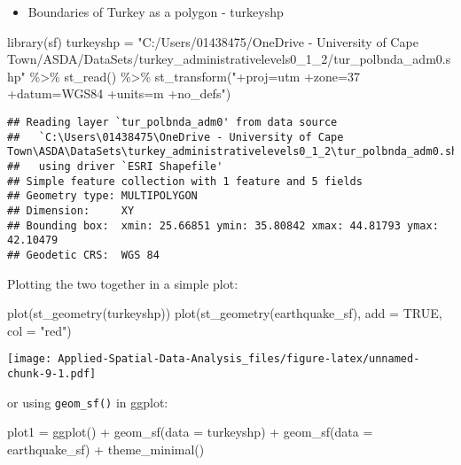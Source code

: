 \documentclass[
]{book}
\newenvironment{Shaded}{\begin{snugshade}}{\end{snugshade}}
\newcommand{\AttributeTok}[1]{\textcolor[rgb]{0.77,0.63,0.00}{#1}}
\newcommand{\ConstantTok}[1]{\textcolor[rgb]{0.00,0.00,0.00}{#1}}
\newcommand{\FunctionTok}[1]{\textcolor[rgb]{0.00,0.00,0.00}{#1}}
\newcommand{\NormalTok}[1]{#1}
\newcommand{\OtherTok}[1]{\textcolor[rgb]{0.56,0.35,0.01}{#1}}
\newcommand{\SpecialCharTok}[1]{\textcolor[rgb]{0.00,0.00,0.00}{#1}}
\newcommand{\StringTok}[1]{\textcolor[rgb]{0.31,0.60,0.02}{#1}}
\providecommand{\tightlist}{%
  \setlength{\itemsep}{0pt}\setlength{\parskip}{0pt}}
\begin{document}
\begin{itemize}
\tightlist
\item
  Boundaries of Turkey as a polygon - turkeyshp
\end{itemize}

\begin{Shaded}
\begin{Highlighting}[]
\FunctionTok{library}\NormalTok{(sf)}
\NormalTok{turkeyshp }\OtherTok{=} \StringTok{"C:/Users/01438475/OneDrive {-} University of Cape Town/ASDA/DataSets/turkey\_administrativelevels0\_1\_2/tur\_polbnda\_adm0.shp"} \SpecialCharTok{\%\textgreater{}\%}
  \FunctionTok{st\_read}\NormalTok{() }\SpecialCharTok{\%\textgreater{}\%}
  \FunctionTok{st\_transform}\NormalTok{(}\StringTok{"+proj=utm +zone=37 +datum=WGS84 +units=m +no\_defs"}\NormalTok{)}
\end{Highlighting}
\end{Shaded}

\begin{verbatim}
## Reading layer `tur_polbnda_adm0' from data source 
##   `C:\Users\01438475\OneDrive - University of Cape Town\ASDA\DataSets\turkey_administrativelevels0_1_2\tur_polbnda_adm0.shp' 
##   using driver `ESRI Shapefile'
## Simple feature collection with 1 feature and 5 fields
## Geometry type: MULTIPOLYGON
## Dimension:     XY
## Bounding box:  xmin: 25.66851 ymin: 35.80842 xmax: 44.81793 ymax: 42.10479
## Geodetic CRS:  WGS 84
\end{verbatim}

Plotting the two together in a simple plot:

\begin{Shaded}
\begin{Highlighting}[]
\FunctionTok{plot}\NormalTok{(}\FunctionTok{st\_geometry}\NormalTok{(turkeyshp))}
\FunctionTok{plot}\NormalTok{(}\FunctionTok{st\_geometry}\NormalTok{(earthquake\_sf), }\AttributeTok{add =} \ConstantTok{TRUE}\NormalTok{, }\AttributeTok{col =} \StringTok{"red"}\NormalTok{)}
\end{Highlighting}
\end{Shaded}

\texttt{[image: Applied-Spatial-Data-Analysis\_files/figure-latex/unnamed-chunk-9-1.pdf]}

or using \texttt{geom\_sf()} in ggplot:

\begin{Shaded}
\begin{Highlighting}[]
\NormalTok{plot1 }\OtherTok{=} \FunctionTok{ggplot}\NormalTok{() }\SpecialCharTok{+}
  \FunctionTok{geom\_sf}\NormalTok{(}\AttributeTok{data =}\NormalTok{ turkeyshp) }\SpecialCharTok{+}
  \FunctionTok{geom\_sf}\NormalTok{(}\AttributeTok{data =}\NormalTok{ earthquake\_sf) }\SpecialCharTok{+}
  \FunctionTok{theme\_minimal}\NormalTok{()}
\end{Highlighting}
\end{Shaded}
\end{document}
